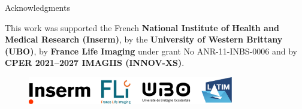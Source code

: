 \begin{frame}{Acknowledgments}

    \vfill

    This work was supported the French \textbf{National Institute of Health and Medical Research (Inserm)}, by the \textbf{University of Western Brittany (UBO)}, by \textbf{France Life Imaging} under grant No ANR-11-INBS-0006 and by \textbf{CPER 2021–2027 IMAGIIS
(INNOV-XS)}.

    \vfill

    \begin{figure}
        \includegraphics[width=0.8\textwidth]{figures/cover/logo.png}
    \end{figure}

    \vfill
    
\end{frame}
